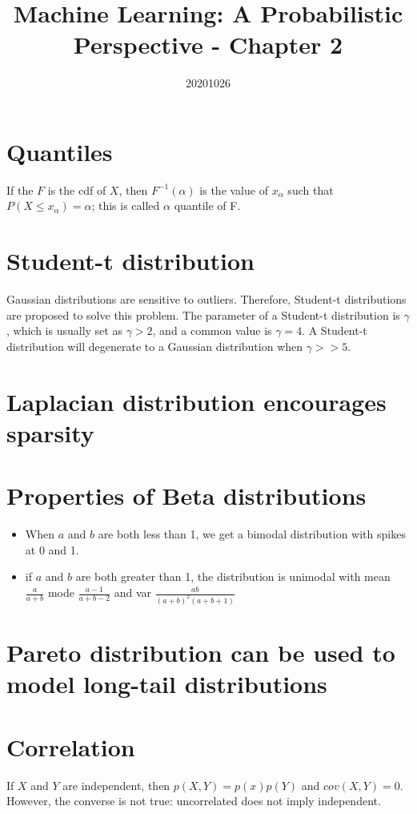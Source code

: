 \documentclass{article}
\title{Machine Learning: A Probabilistic Perspective - Chapter 2}
\date{20201026}
\begin{document}
\section{Quantiles}

If the $F$ is the cdf of $X$, then $F^{-1}(\alpha)$ is the value of $x_{\alpha}$ such that $P(X \leq x_{\alpha}) = \alpha$; this is called $\alpha$ quantile of F.

\section{Student-t distribution}

Gaussian distributions are sensitive to outliers. Therefore, Student-t distributions are proposed to solve this problem. The parameter of a Student-t distribution is $\gamma$, which is usually set as $\gamma > 2$,
and a common value is $\gamma = 4$. A Student-t distribution will degenerate to a Gaussian distribution when $\gamma >> 5$.

\section{Laplacian distribution encourages sparsity}

\section{Properties of Beta distributions}

\begin{itemize}
    \item When $a$ and $b$ are both less than 1, we get a bimodal distribution with spikes at 0 and 1.
    \item if $a$ and $b$ are both greater than 1, the distribution is unimodal with mean $\frac{a}{a+b}$ mode $\frac{a-1}{a+b-2}$ and var $\frac{ab}{(a+b)^2(a+b+1)}$
\end{itemize}

\section{Pareto distribution can be used to model long-tail distributions}

\section{Correlation}

If $X$ and $Y$ are independent, then $p(X, Y) = p(x) p(Y)$ and $cov(X, Y) = 0$.
However, the converse is not true: uncorrelated does not imply independent.
\end{document}

